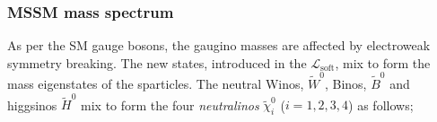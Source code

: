 


			\subsubsection*{MSSM mass spectrum}




				As per the \ac{SM} gauge bosons, the gaugino masses are affected by electroweak symmetry breaking. The new states, introduced in the $\mathcal L_{\mathrm{soft}}$, mix to form the mass eigenstates of the sparticles. The neutral Winos, $\tilde{W}^0$, Binos, $\tilde{B}^0$ and higgsinos $\tilde{H}^0$ mix to form the four \textit{neutralinos} $\tilde{\chi}^0_i$ ($i=1,2,3,4$) as follows; 

